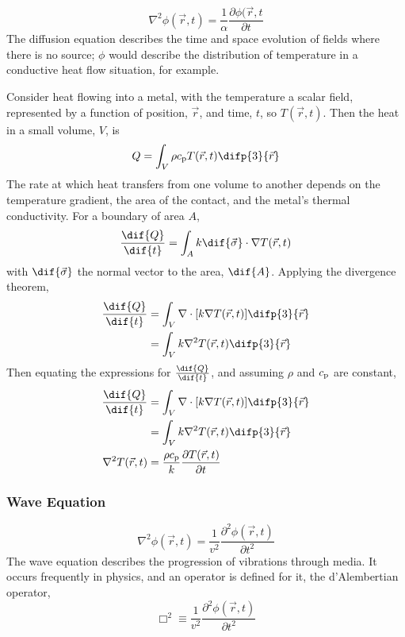 \begin{equation}
  \label{eq:diffusion}
  \nabla^2 \phi(\vec{r}, t) = \frac{1}{\alpha} \frac{\partial \phi(\vec{r}, t}{\partial t}
\end{equation}
The diffusion equation describes the time and space evolution of
fields where there is no source; $\phi$ would describe the
distribution of temperature in a conductive heat flow situation, for
example.
\begin{example}
  Consider heat flowing into a metal, with the temperature a scalar
  field, represented by a function of position, $\vec{r}$, and time,
  $t$, so $T(\vec{r}, t)$. Then the heat in a small volume, $V$, is
  \[ Q = \int_V \rho c_{\rm p} T(\vec{r}, t) \difp{3}{\vec{r}} \] The
  rate at which heat transfers from one volume to another depends on
  the temperature gradient, the area of the contact, and the metal's
  thermal conductivity. For a boundary of area $A$,
  \[ \frac{\dif{Q}}{\dif{t}} = \int_A k \dif{\vec{\sigma}} \cdot
  \nabla T(\vec{r}, t) \] with $\dif{\vec{\sigma}}$ the normal vector
  to the area, $\dif{A}$. Applying the divergence theorem,
  \begin{align*}
    \frac{\dif{Q}}{\dif{t}} &= \int_V \nabla \cdot [k \nabla
    T(\vec{r}, t)] \difp{3}{\vec{r}} \\
    &= \int_V k \nabla^2 T(\vec{r}, t) \difp{3}{\vec{r}}
  \end{align*}
  Then equating the expressions for $\frac{\dif{Q}}{\dif{t}}$, and
  assuming $\rho$ and $c_{\rm p}$ are constant,
  \begin{align*}
    \frac{\dif{Q}}{\dif{t}} &= \int_V \nabla \cdot [k \nabla
    T(\vec{r}, t) ] \difp{3}{\vec{r}} \\ &= \int_{V} k \nabla^2
    T(\vec{r}, t) \difp{3}{\vec{r}} \\ \nabla^2 T(\vec{r}, t) &=
    \frac{\rho c_{\rm p}}{k} \frac{\partial T(\vec{r},t)}{\partial t}
  \end{align*}
\end{example}

\subsubsection{Wave Equation}
\label{sec:wavepde}

\begin{equation}
  \label{eq:wave}
  \nabla^2 \phi(\vec{r}, t) = \frac{1}{v^2} \frac{\partial^2 \phi(\vec{r}, t)}{\partial t^2}
\end{equation}
The wave equation describes the progression of vibrations through
media. It occurs frequently in physics, and an operator is defined for
it, the d'Alembertian operator,
\begin{equation}\Box^2 \equiv \frac{1}{v^2}
  \frac{\partial^2 \phi(\vec{r}, t)}{\partial t^2}
\end{equation}

